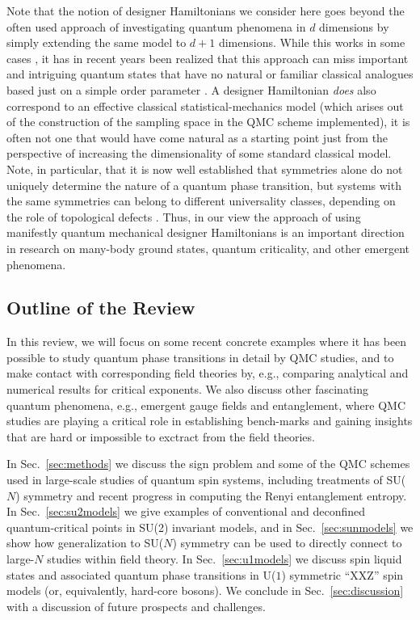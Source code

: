 \documentclass[range]{ar2e}
\begin{document}
Note that the notion of designer Hamiltonians we consider here goes beyond the often used approach of investigating quantum phenomena 
in $d$ dimensions by simply extending the same model to $d+1$ dimensions. While this works in some cases \cite{Rieger94,Sorensen92,Nahum11}, 
it has in recent years been realized that this approach can miss important and intriguing quantum states that have no natural or familiar 
classical analogues based just on a simple order parameter \cite{Senthil04a,Fradkin04,Sachdev08}. A designer Hamiltonian {\it does} also
correspond to an effective classical statistical-mechanics model (which arises out of the construction of the sampling space in the QMC 
scheme implemented), it is often not one that would have come natural as a starting point just from the perspective of increasing the 
dimensionality of some standard classical model. Note, in particular, that it is now well established that symmetries alone do not uniquely 
determine the nature of a quantum phase transition, but systems with the same symmetries can belong to different universality classes, 
depending on the role of topological defects \cite{Motrunich04}. Thus, in our view the approach of using manifestly quantum mechanical 
designer Hamiltonians is an important direction in research on many-body ground states, quantum criticality, and other emergent phenomena.

\subsection{Outline of the Review}

In this review, we will focus on some recent concrete examples where it has been possible to study quantum phase transitions in detail 
by QMC studies, and to make contact with corresponding field theories by, e.g., comparing analytical and numerical results for critical 
exponents. We also discuss other fascinating quantum phenomena, e.g., emergent gauge fields and entanglement, where QMC studies are
playing a critical role in establishing bench-marks and gaining insights that are hard or impossible to exctract from the field theories.

In Sec.~\ref{sec:methods} we discuss the sign problem and some of the QMC schemes used in large-scale studies of quantum spin systems, 
including treatments of SU($N$) symmetry and recent progress in computing the Renyi entanglement entropy. In Sec.~\ref{sec:su2models} 
we give examples of conventional and deconfined quantum-critical points in SU(2) invariant models, and in Sec.~\ref{sec:sunmodels} 
we show how generalization to SU($N$) symmetry can be used to directly connect to large-$N$ studies within field theory. In Sec.~\ref{sec:u1models} 
we discuss spin liquid states and associated quantum phase transitions in U($1$) symmetric ``XXZ'' spin models (or, equivalently, hard-core bosons). 
We conclude in Sec.~\ref{sec:discussion} with a discussion of future prospects and challenges.
\end{document}
